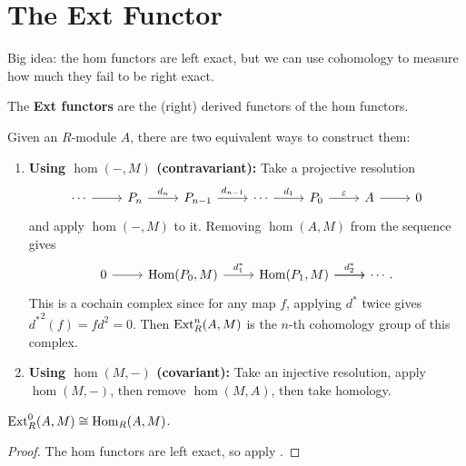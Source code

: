 \documentclass[twoside,10pt]{report}
\begin{document}
\section{The Ext Functor}

\begin{note}[]
Big idea: the hom functors are left exact, but we can use cohomology to measure how much they fail to be right exact.
\end{note}

\begin{defn}[]
	The \textbf{Ext functors} are the (right) derived functors of the hom functors.
\end{defn}

Given an $R$-module $A$, there are two equivalent ways to construct them:
\begin{enumerate}
	\item \textbf{Using $\hom(-,M)$ (contravariant):} Take a projective resolution
\[
\begin{tikzcd}
	\cdots \rar & P_{n}\rar{d_{n}} & P_{n-1}\rar{d_{n-1}} & \cdots \rar{d_1} & P_0 \rar{\varepsilon} & A \rar & 0
\end{tikzcd}
\] 
and apply $\hom(-,M)$ to it. Removing $\hom(A,M)$ from the sequence gives
\[
	\begin{tikzcd}
		0 \rar & \hom(P_0,M) \rar{d_1^{*}} & \hom(P_1,M)\rar{d_2^{*}} \rar & \cdots.
	\end{tikzcd}
\] 
This is a cochain complex since for any map $f$, applying $d^{*}$ twice gives ${d^{*}}^2(f) = fd^2=0$. Then $\operatorname{Ext}_{R}^{n}(A,M)$ is the $n$-th cohomology group of this complex.

	\item \textbf{Using $\hom(M,-)$ (covariant):} Take an injective resolution, apply $\hom(M,-)$, then remove $\hom(M,A)$, then take homology. 
\end{enumerate}

\begin{prop}
	$\operatorname{Ext}_{R}^{0}(A,M)\cong \operatorname{Hom}_{R}(A,M)$.
\end{prop}
\begin{proof}
	The hom functors are left exact, so apply .
\end{proof}

\end{document}
